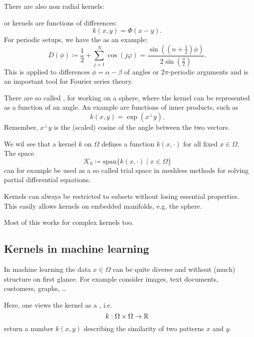 \begin{remark}
    There are also non radial kernels:
    
     or  
    kernels are functions of differences:
    \[k(x,y)=\Phi(x-y).\]
    For periodic setups, we have the  as an example:
    \[D(\phi)\coloneqq \frac{1}{2}+\sum_{j=1}^N\cos(j\varphi)=\frac{\sin\left(\left(n+\frac{1}{2}\right)\phi\right)}{2\sin\left(\frac{\phi}{2}\right)}.\]
    This is applied to differences $\phi=\alpha-\beta$ of angles or $2\pi$-periodic arguments and is an important tool for Fourier series theory.

    There are so called , for working on a sphere, where the kernel 
    can be represented as a function of an angle. An example are functions of inner products, such as 
    \[k(x,y)=\exp(x^\perp y).\]
    Remember, $x^\perp y$ is the (scaled) cosine of the angle between the two vectors.
\end{remark}

\begin{remark}
    We wil see that a kernel $k$ on $\Omega$ defines a function $k(x,\cdot)$ for all fixed $x\in\Omega$. The space
    \[\mathcal{K}_0\coloneqq \text{span}\{k(x,\cdot)\mid x\in\Omega\}\]
    can for example be used as a so called trial space in meshless methods for solving partial differential equations.
\end{remark}
\begin{remark}
    Kernels can always be restricted to subsets without losing essential properties.
    This easily allows kernels on embedded manifolds, e.g. the sphere.
\end{remark}
\begin{remark}
    Most of this works for complex kernels too.
\end{remark}

\subsection{Kernels in machine learning}

In machine learning the data $x\in\Omega$ can be quite diverse and without (much)
structure on first glance. For example consider images, text documents, customers, graphs, \dots

Here, one views the kernel as a , i.e.
\[k:\Omega\times \Omega\to\mathbb{R}\]
return a number $k(x,y)$ describing the similarity of two patterns $x$ and $y$.

